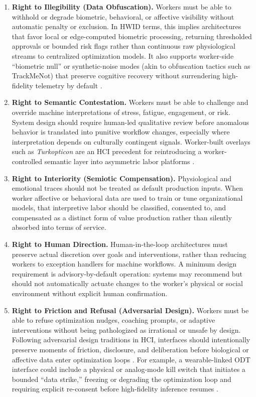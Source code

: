 \documentclass[runningheads]{llncs}
\begin{document}
\begin{enumerate}
\item \textbf{Right to Illegibility (Data Obfuscation).} Workers must be able to withhold or degrade biometric, behavioral, or affective visibility without automatic penalty or exclusion. In HWID terms, this implies architectures that favor local or edge-computed biometric processing, returning thresholded approvals or bounded risk flags rather than continuous raw physiological streams to centralized optimization models. It also supports worker-side ``biometric null'' or synthetic-noise modes (akin to obfuscation tactics such as TrackMeNot) that preserve cognitive recovery without surrendering high-fidelity telemetry by default \cite{nissenbaum2015obfuscation}.

\item \textbf{Right to Semantic Contestation.} Workers must be able to challenge and override machine interpretations of stress, fatigue, engagement, or risk. System design should require human-led qualitative review before anomalous behavior is translated into punitive workflow changes, especially where interpretation depends on culturally contingent signals. Worker-built overlays such as \emph{Turkopticon} are an HCI precedent for reintroducing a worker-controlled semantic layer into asymmetric labor platforms \cite{irani2013turkopticon}.

\item \textbf{Right to Interiority (Semiotic Compensation).} Physiological and emotional traces should not be treated as default production inputs. When worker affective or behavioral data are used to train or tune organizational models, that interpretive labor should be classified, consented to, and compensated as a distinct form of value production rather than silently absorbed into terms of service.

\item \textbf{Right to Human Direction.} Human-in-the-loop architectures must preserve actual discretion over goals and interventions, rather than reducing workers to exception handlers for machine workflows. A minimum design requirement is advisory-by-default operation: systems may recommend but should not automatically actuate changes to the worker's physical or social environment without explicit human confirmation.

\item \textbf{Right to Friction and Refusal (Adversarial Design).} Workers must be able to refuse optimization nudges, coaching prompts, or adaptive interventions without being pathologized as irrational or unsafe by design. Following adversarial design traditions in HCI, interfaces should intentionally preserve moments of friction, disclosure, and deliberation before biological or affective data enter optimization loops \cite{disalvo2012adversarial}. For example, a wearable-linked ODT interface could include a physical or analog-mode kill switch that initiates a bounded ``data strike,'' freezing or degrading the optimization loop and requiring explicit re-consent before high-fidelity inference resumes \cite{nissenbaum2015obfuscation}.


\end{enumerate}
\end{document}
